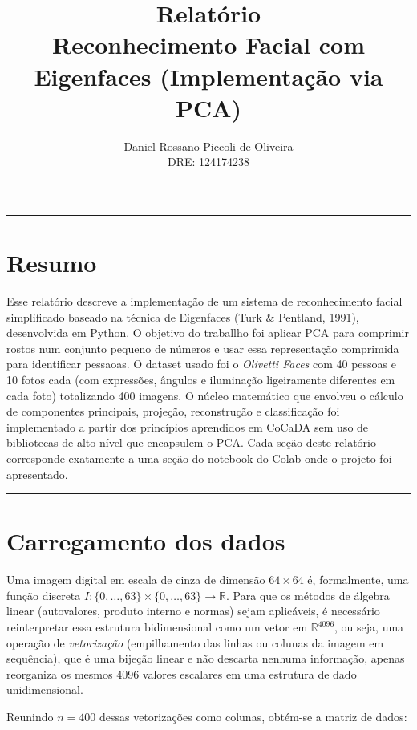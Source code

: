 \documentclass[12pt,a4paper]{article}
\begin{document}
\title{Relatório \\ Reconhecimento Facial com Eigenfaces (Implementação via PCA)}
\author{Daniel Rossano Piccoli de Oliveira \\ DRE: 124174238}
\date{}
\maketitle

\noindent\rule{\textwidth}{0.4pt}

\section*{Resumo}

Esse relatório descreve a implementação de um sistema de
reconhecimento facial simplificado baseado na técnica de Eigenfaces (Turk \&
Pentland, 1991), desenvolvida em Python. O objetivo do traballho foi aplicar PCA para comprimir rostos num conjunto pequeno de números e usar essa representação comprimida para identificar pessaoas. O dataset usado foi o \textit{Olivetti Faces} com 40 pessoas e 10 fotos cada (com expressões, ângulos e iluminação ligeiramente diferentes em cada foto) totalizando 400 imagens.
O núcleo matemático que envolveu o cálculo de componentes principais, projeção, reconstrução e
classificação foi implementado a partir dos princípios aprendidos em
CoCaDA sem uso de bibliotecas de alto nível que encapsulem o PCA. Cada seção deste relatório corresponde exatamente a uma seção do
notebook do Colab onde o projeto foi apresentado.

\noindent\rule{\textwidth}{0.4pt}

\section{Carregamento dos dados}

Uma imagem digital em escala de cinza de dimensão $64 \times 64$ é, formalmente, uma
função discreta $I: \{0,\dots,63\}\times\{0,\dots,63\} \to \mathbb{R}$. Para que os
métodos de álgebra linear (autovalores, produto interno e normas) sejam
aplicáveis, é necessário reinterpretar essa estrutura bidimensional como um vetor
em $\mathbb{R}^{4096}$, ou seja, uma operação de \textit{vetorização} (empilhamento das linhas ou
colunas da imagem em sequência), que é uma bijeção linear e não descarta nenhuma
informação, apenas reorganiza os mesmos 4096 valores escalares em uma estrutura de
dado unidimensional.

Reunindo $n=400$ dessas vetorizações como colunas, obtém-se a matriz de dados:
\end{document}
